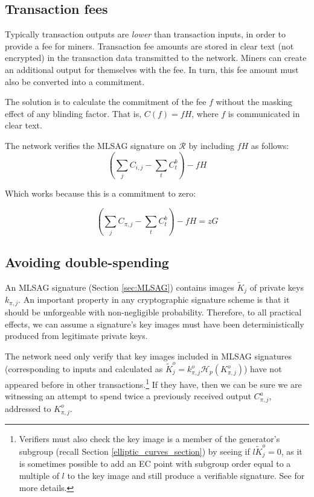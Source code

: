 \subsection{Transaction fees}

Typically transaction outputs are {\em lower} than transaction inputs, in order to provide a fee for miners. Transaction fee amounts are stored in clear text (not encrypted) in the transaction data transmitted to the network. Miners can create an additional output for themselves with the fee. In turn, this fee amount must also be converted into a commitment.

The solution is to calculate the commitment of the fee $f$ without the masking effect of any blinding factor. That is, $C(f) = f H$, where $f$ is communicated in clear text.

The network verifies the MLSAG signature on $\mathcal{R}$ by including $f H$ as follows:\\
\[ (\sum\limits_j C_{i, j} - \sum\limits_t C^b_{t}) - f H\]

Which works because this is a commitment to zero:

\[ (\sum\limits_j C_{\pi, j} - \sum\limits_t C^b_{t}) - f H = z G\]

\subsection{Avoiding double-spending}

An MLSAG signature (Section \ref{sec:MLSAG}) contains images \(\tilde{K}_{j}\) of private keys \(k_{\pi, j}\). An important property in any cryptographic signature scheme is that it should be unforgeable with non-negligible probability. Therefore, to all practical effects, we can assume a signature’s key images must have been deterministically produced from legitimate private keys.
	
The network need only verify that key images included in MLSAG signatures (corresponding to inputs and calculated as $\tilde{K}^o_{j} = k^o_{\pi,j} \mathcal{H}_p(K^o_{\pi,j})$) have not appeared before in other transactions.\footnote{Verifiers must also check the key image is a member of the generator's subgroup (recall Section \ref{elliptic_curves_section}) by seeing if $l \tilde{K}^o_{j} = 0$, as it is sometimes possible to add an EC point with subgroup order equal to a multiple of $l$ to the key image and still produce a verifiable signature. See \cite{key-image-bug} for more details.} If they have, then we can be sure we are witnessing an attempt to spend twice a previously received output $C^a_{\pi,j}$, addressed to $K_{\pi,j}^o$.

